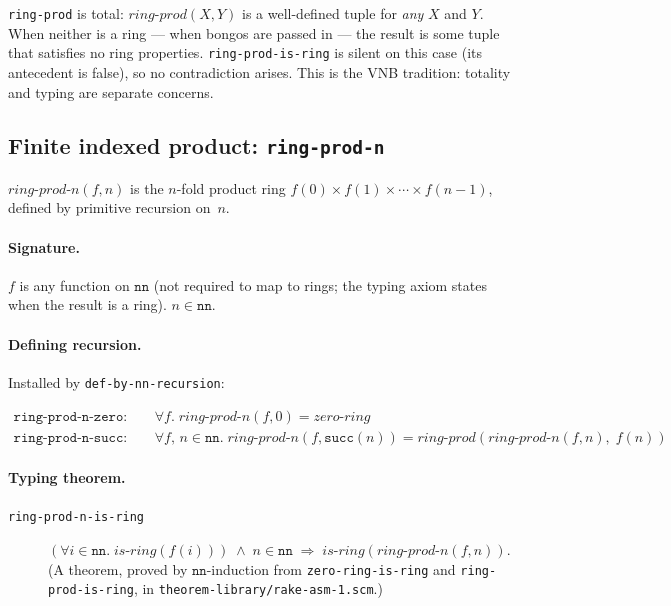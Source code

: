 \begin{remark}[Totality]
\texttt{ring-prod} is total: $\mathit{ring\text{-}prod}(X,Y)$ is a
well-defined tuple for \emph{any} $X$ and $Y$.  When neither is a ring
--- when bongos are passed in --- the result is some tuple that satisfies
no ring properties.  \texttt{ring-prod-is-ring} is silent on this case (its
antecedent is false), so no contradiction arises.  This is the VNB
tradition: totality and typing are separate concerns.
\end{remark}

\subsection{Finite indexed product: \texttt{ring-prod-n}}

$\mathit{ring\text{-}prod\text{-}n}(f, n)$ is the $n$-fold product ring
$f(0) \times f(1) \times \cdots \times f(n-1)$, defined by primitive
recursion on~$n$.

\paragraph{Signature.}
$f$ is any function on $\mathtt{nn}$ (not required to map to rings;
the typing axiom states when the result is a ring).
$n \in \mathtt{nn}$.

\paragraph{Defining recursion.}
Installed by \texttt{def-by-nn-recursion}:

\begin{align*}
\mathtt{ring\text{-}prod\text{-}n\text{-}zero}: &\quad
  \forall f.\; \mathit{ring\text{-}prod\text{-}n}(f, 0) = \mathit{zero\text{-}ring} \\
\mathtt{ring\text{-}prod\text{-}n\text{-}succ}: &\quad
  \forall f,\, n \in \mathtt{nn}.\;
  \mathit{ring\text{-}prod\text{-}n}(f, \mathtt{succ}(n))
  = \mathit{ring\text{-}prod}(\mathit{ring\text{-}prod\text{-}n}(f, n),\; f(n))
\end{align*}

\paragraph{Typing theorem.}
\begin{description}
\item[\texttt{ring-prod-n-is-ring}]
  $(\forall i \in \mathtt{nn}.\;\mathit{is\text{-}ring}(f(i)))
  \;\wedge\; n \in \mathtt{nn}
  \;\Rightarrow\; \mathit{is\text{-}ring}(\mathit{ring\text{-}prod\text{-}n}(f,n))$.\\
  (A theorem, proved by $\mathtt{nn}$-induction from \texttt{zero-ring-is-ring}
  and \texttt{ring-prod-is-ring}, in \texttt{theorem-library/rake-asm-1.scm}.)
\end{description}

